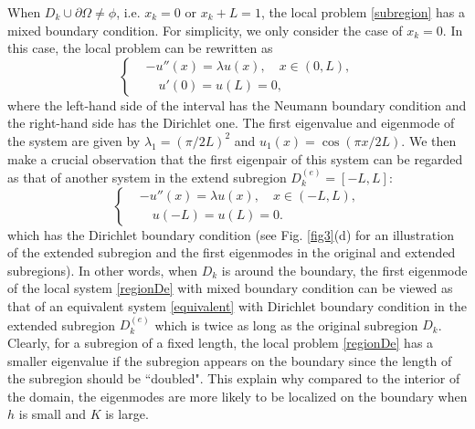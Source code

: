 \documentclass[a4paper,11pt]{article}
\begin{document}
When $D_k \cup \partial \Omega \neq \phi$, i.e. $x_k=0$ or $x_k+L=1$, the local problem \eqref{subregion} has a mixed boundary condition. For simplicity, we only consider the case of $x_k = 0$. In this case, the local problem can be rewritten as
\begin{equation}\label{regionDe}
\left\{
\begin{split}
& - u''(x) = \lambda u(x), \quad x \in (0, L), \\
& \quad u'(0) = u(L) = 0,
\end{split}
\right.
\end{equation}
where the left-hand side of the interval has the Neumann boundary condition and the right-hand side has the Dirichlet one. The first eigenvalue and eigenmode of the system are given by $\lambda_1 = (\pi/2L)^2$ and $u_1(x) = \cos(\pi x/2L)$. We then make a crucial observation that the first eigenpair of this system can be regarded as that of another system in the extend subregion $D_k^{(e)} = [-L, L]$:
\begin{equation}\label{equivalent}
\left\{
\begin{split}
& - u''(x) = \lambda u(x), \quad x \in (-L, L), \\
& \quad u(-L) = u(L) = 0.
\end{split}
\right.
\end{equation}
which has the Dirichlet boundary condition (see Fig. \ref{fig3}(d) for an illustration of the extended subregion and the first eigenmodes in the original and extended subregions). In other words, when $D_k$ is around the boundary, the first eigenmode of the local system \eqref{regionDe} with mixed boundary condition can be viewed as that of an equivalent system \eqref{equivalent} with Dirichlet boundary condition in the extended subregion $D_k^{(e)}$ which is twice as long as the original subregion $D_k$. Clearly, for a subregion of a fixed length, the local problem \eqref{regionDe} has a smaller eigenvalue if the subregion appears on the boundary since the length of the subregion should be ``doubled". This explain why compared to the interior of the domain, the eigenmodes are more likely to be localized on the boundary when $h$ is small and $K$ is large.
\end{document}
